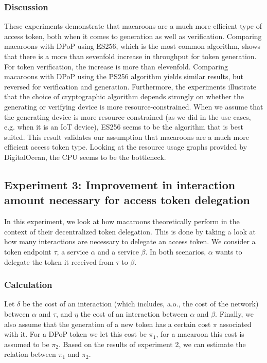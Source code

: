 \subsubsection{Discussion}
These experiments demonstrate that macaroons are a much more efficient type of access token, both when it comes to generation as well as verification. Comparing macaroons with \gls{DPoP} using ES256, which is the most common algorithm, shows that there is a more than sevenfold increase in throughput for token generation. For token verification, the increase is more than elevenfold. Comparing macaroons with \gls{DPoP} using the PS256 algorithm yields similar results, but reversed for verification and generation. Furthermore, the experiments illustrate that the choice of cryptographic algorithm depends strongly on whether the generating or verifying device is more resource-constrained. When we assume that the generating device is more resource-constrained (as we did in the use cases, e.g. when it is an IoT device), ES256 seems to be the algorithm that is best suited.  This result validates our assumption that macaroons are a much more efficient access token type. Looking at the resource usage graphs provided by DigitalOcean, the CPU seems to be the bottleneck.

\subsection{Experiment 3: Improvement in interaction amount necessary for access token delegation}
\label{sec:interactions-access-token-delegation}
In this experiment, we look at how macaroons theoretically perform in the context of their decentralized token delegation. This is done by taking a look at how many interactions are necessary to delegate an access token. We consider a token endpoint $\tau$, a service $\alpha$ and a service $\beta$. In both scenarios, $\alpha$ wants to delegate the token it received from $\tau$ to $\beta$.

\subsubsection{Calculation}
Let $\delta$ be the cost of an interaction (which includes, a.o., the cost of the network) between $\alpha$ and $\tau$, and $\eta$ the cost of an interaction between $\alpha$ and $\beta$. Finally, we also assume that the generation of a new token has a certain cost $\pi$ associated with it. For a \gls{DPoP} token we let this cost be $\pi_1$, for a macaroon this cost is assumed to be $\pi_2$. Based on the results of experiment 2, we can estimate the relation between $\pi_1$ and $\pi_2$.\\

